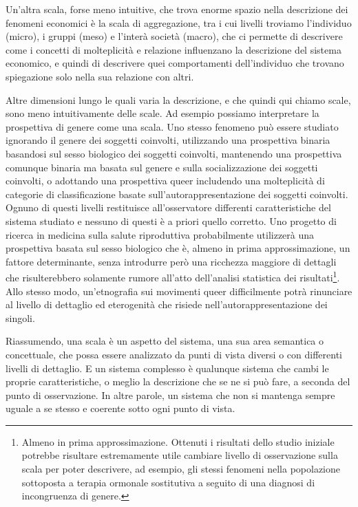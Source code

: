 \documentclass[a4paper, headings=standardclasses]{scrartcl}
\begin{document}
Un'altra scala, forse meno intuitive, che trova enorme spazio nella descrizione dei fenomeni economici è la scala di aggregazione, tra i cui livelli troviamo l'individuo (micro), i gruppi (meso) e l'interà società (macro), che ci permette di descrivere come i concetti di molteplicità e relazione influenzano la descrizione del sistema economico, e quindi di descrivere quei comportamenti dell'individuo che trovano spiegazione solo nella sua relazione con altri. 

Altre dimensioni lungo le quali varia la descrizione, e che quindi qui chiamo scale, sono meno intuitivamente delle scale.
Ad esempio possiamo interpretare la prospettiva di genere come una scala.
Uno stesso fenomeno può essere studiato ignorando il genere dei soggetti coinvolti, utilizzando una prospettiva binaria basandosi sul sesso biologico dei soggetti coinvolti, mantenendo una prospettiva comunque binaria ma basata sul genere e sulla socializzazione dei soggetti coinvolti, o adottando una prospettiva queer includendo una molteplicità di categorie di classificazione basate sull'autorappresentazione dei soggetti coinvolti.
Ognuno di questi livelli restituisce all'osservatore differenti caratteristiche del sistema studiato e nessuno di questi è a priori quello corretto.
Uno progetto di ricerca in medicina sulla salute riproduttiva probabilmente utilizzerà una prospettiva basata sul sesso biologico che è, almeno in prima approssimazione, un fattore determinante, senza introdurre però una ricchezza maggiore di dettagli che risulterebbero solamente rumore all'atto dell'analisi statistica dei risultati\footnote{Almeno in prima approssimazione. Ottenuti i risultati dello studio iniziale potrebbe risultare estremamente utile cambiare livello di osservazione sulla scala per poter descrivere, ad esempio, gli stessi fenomeni nella popolazione sottoposta a terapia ormonale sostitutiva a seguito di una diagnosi di incongruenza di genere.}.
Allo stesso modo, un'etnografia sui movimenti queer difficilmente potrà rinunciare al livello di dettaglio ed eterogenità che risiede nell'autorappresentazione dei singoli.

Riassumendo, una scala è un aspetto del sistema, una sua area semantica o concettuale, che possa essere analizzato da punti di vista diversi o con differenti livelli di dettaglio.
E un sistema complesso è qualunque sistema che cambi le proprie caratteristiche, o meglio la descrizione che se ne si può fare, a seconda del punto di osservazione. In altre parole, un sistema che non si mantenga sempre uguale a se stesso e coerente sotto ogni punto di vista.
\end{document}
